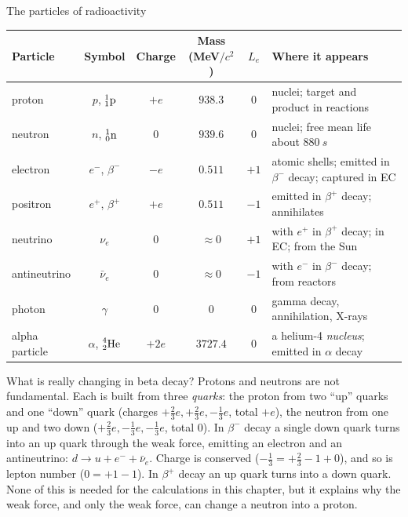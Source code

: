 \begin{tablebox}{The particles of radioactivity}
\centering
\renewcommand{\arraystretch}{1.15}
\begin{tabular}{@{}lcccc>{\raggedright\arraybackslash}p{5.0cm}@{}}
\toprule
\textbf{Particle} & \textbf{Symbol} & \textbf{Charge} & \textbf{Mass (MeV$/c^2$)} & $L_e$ & \textbf{Where it appears}\\
\midrule
proton & $p$, $\prescript{1}{1}{\mathrm{p}}$ & $+e$ & $938.3$ & $0$ & nuclei; target and product in reactions\\
neutron & $n$, $\prescript{1}{0}{\mathrm{n}}$ & $0$ & $939.6$ & $0$ & nuclei; free mean life about $\SI{880}{s}$\\
electron & $e^-$, $\beta^-$ & $-e$ & $0.511$ & $+1$ & atomic shells; emitted in $\beta^-$ decay; captured in EC\\
positron & $e^+$, $\beta^+$ & $+e$ & $0.511$ & $-1$ & emitted in $\beta^+$ decay; annihilates\\
neutrino & $\nu_e$ & $0$ & $\approx0$ & $+1$ & with $e^+$ in $\beta^+$ decay; in EC; from the Sun\\
antineutrino & $\bar\nu_e$ & $0$ & $\approx0$ & $-1$ & with $e^-$ in $\beta^-$ decay; from reactors\\
photon & $\gamma$ & $0$ & $0$ & $0$ & gamma decay, annihilation, X-rays\\
alpha particle & $\alpha$, $\prescript{4}{2}{\mathrm{He}}$ & $+2e$ & $3727.4$ & $0$ & a helium-4 \emph{nucleus}; emitted in $\alpha$ decay\\
\bottomrule
\end{tabular}\label{tab:decay-particles}
\end{tablebox}

\begin{remarkbox}{What is really changing in beta decay?}
Protons and neutrons are not fundamental. Each is built from three \emph{quarks}: the proton from two
``up'' quarks and one ``down'' quark (charges $+\tfrac23e,+\tfrac23e,-\tfrac13e$, total $+e$), the neutron
from one up and two down ($+\tfrac23e,-\tfrac13e,-\tfrac13e$, total $0$). In $\beta^-$ decay a single
down quark turns into an up quark through the weak force, emitting an electron and an antineutrino:
$d\to u+e^-+\bar\nu_e$. Charge is conserved ($-\tfrac13=+\tfrac23-1+0$), and so is lepton number
($0=+1-1$). In $\beta^+$ decay an up quark turns into a down quark. None of this is needed for the
calculations in this chapter, but it explains why the weak force, and only the weak force, can change a
neutron into a proton.
\end{remarkbox}

